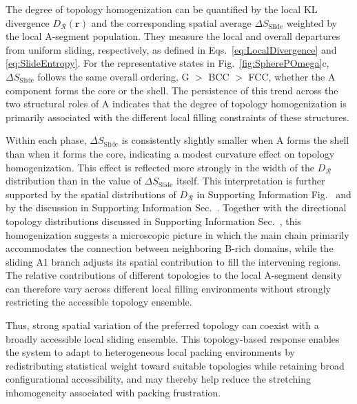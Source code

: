The degree of topology homogenization can be quantified by the local KL divergence $D_{\mathcal R}(\bm r)$ and the corresponding spatial average $\Delta S_{\mathrm{Slide}}$ weighted by the local A-segment population.
They measure the local and overall departures from uniform sliding, respectively, as defined in Eqs.~\eqref{eq:LocalDivergence} and \eqref{eq:SlideEntropy}.
For the representative states in Fig.~\ref{fig:SpherePOmega}c, $\Delta S_{\mathrm{Slide}}$ follows the same overall ordering, G $>$ BCC $>$ FCC, whether the A component forms the core or the shell.
The persistence of this trend across the two structural roles of A indicates that the degree of topology homogenization is primarily associated with the different local filling constraints of these structures.

Within each phase, $\Delta S_{\mathrm{Slide}}$ is consistently slightly smaller when A forms the shell than when it forms the core, indicating a modest curvature effect on topology homogenization.
This effect is reflected more strongly in the width of the $D_{\mathcal R}$ distribution than in the value of $\Delta S_{\mathrm{Slide}}$ itself.
This interpretation is further supported by the spatial distributions of $D_{\mathcal R}$ in Supporting Information Fig.~ and by the discussion in Supporting Information Sec.~.
Together with the directional topology distributions discussed in Supporting Information Sec.~, this homogenization suggests a microscopic picture in which the main chain primarily accommodates the connection between neighboring B-rich domains, while the sliding A1 branch adjusts its spatial contribution to fill the intervening regions.
The relative contributions of different topologies to the local A-segment density can therefore vary across different local filling environments without strongly restricting the accessible topology ensemble.


Thus, strong spatial variation of the preferred topology can coexist with a broadly accessible local sliding ensemble.
This topology-based response enables the system to adapt to heterogeneous local packing environments by redistributing statistical weight toward suitable topologies while retaining broad configurational accessibility, and may thereby help reduce the stretching inhomogeneity associated with packing frustration.

